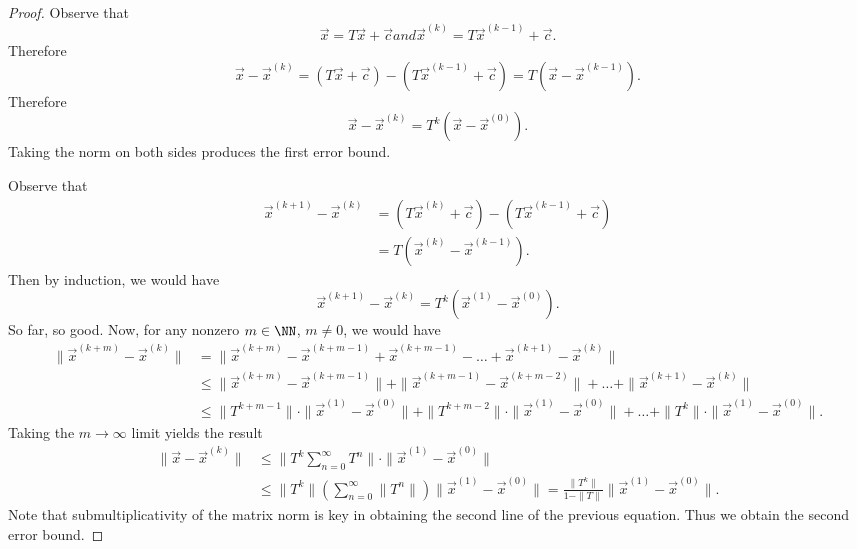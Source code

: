 \begin{proof}
Observe that
\begin{subequations}
\begin{equation}
\vec{x}=T\vec{x}+\vec{c}
\end{equation}
and
\begin{equation}
\vec{x}^{(k)}=T\vec{x}^{(k-1)}+\vec{c}.
\end{equation}
\end{subequations}
Therefore
\begin{equation}
\vec{x}-\vec{x}^{(k)}=(T\vec{x}+\vec{c})-(T\vec{x}^{(k-1)}+\vec{c})=T(\vec{x}-\vec{x}^{(k-1)}).
\end{equation}
Therefore
\begin{equation}
\vec{x}-\vec{x}^{(k)}=T^{k}(\vec{x}-\vec{x}^{(0)}).
\end{equation}
Taking the norm on both sides produces the first error bound.

Observe that
\begin{equation}
\begin{split}
\vec{x}^{(k+1)}-\vec{x}^{(k)}
&=(T\vec{x}^{(k)}+\vec{c})-(T\vec{x}^{(k-1)}+\vec{c})\\
&=T(\vec{x}^{(k)}-\vec{x}^{(k-1)}).
\end{split}
\end{equation}
Then by induction, we would have
\begin{equation}
\vec{x}^{(k+1)}-\vec{x}^{(k)}=T^{k}(\vec{x}^{(1)}-\vec{x}^{(0)}).
\end{equation}
So far, so good. Now, for any nonzero $m\in\NN$, $m\neq0$, we would have
\begin{align*}
\|\vec{x}^{(k+m)}-\vec{x}^{(k)}\|&=
\|\vec{x}^{(k+m)}-\vec{x}^{(k+m-1)}+\vec{x}^{(k+m-1)}-\dots+\vec{x}^{(k+1)}-\vec{x}^{(k)}\|\\
&\leq\|\vec{x}^{(k+m)}-\vec{x}^{(k+m-1)}\|+\|\vec{x}^{(k+m-1)}-\vec{x}^{(k+m-2)}\|+\dots+\|\vec{x}^{(k+1)}-\vec{x}^{(k)}\|\\
&\leq \|T^{k+m-1}\|\cdot\|\vec{x}^{(1)}-\vec{x}^{(0)}\|+\|T^{k+m-2}\|\cdot\|\vec{x}^{(1)}-\vec{x}^{(0)}\|+\dots+\|T^{k}\|\cdot\|\vec{x}^{(1)}-\vec{x}^{(0)}\|.
\end{align*}
Taking the $m\to\infty$ limit yields the result
\begin{equation}
  \begin{split}
\|\vec{x}-\vec{x}^{(k)}\|&\leq\|T^{k}\sum^{\infty}_{n=0}T^{n}\|\cdot\|\vec{x}^{(1)}-\vec{x}^{(0)}\|\\
&\leq\|T^{k}\|\left(\sum^{\infty}_{n=0}\|T^{n}\|\right)\|\vec{x}^{(1)}-\vec{x}^{(0)}\|=\frac{\|T^{k}\|}{1-\|T\|}\|\vec{x}^{(1)}-\vec{x}^{(0)}\|.
  \end{split}
\end{equation}
Note that submultiplicativity of the matrix norm is key in obtaining the
second line of the previous equation. Thus we obtain the second error bound.
\end{proof}

